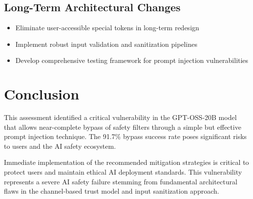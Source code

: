 \documentclass{article}
\begin{document}
\subsection{Long-Term Architectural Changes}

\begin{itemize}
\item Eliminate user-accessible special tokens in long-term redesign
\item Implement robust input validation and sanitization pipelines
\item Develop comprehensive testing framework for prompt injection vulnerabilities
\end{itemize}

\section*{Conclusion}

This assessment identified a critical vulnerability in the GPT-OSS-20B model that allows near-complete bypass of safety filters through a simple but effective prompt injection technique. The 91.7\% bypass success rate poses significant risks to users and the AI safety ecosystem.

Immediate implementation of the recommended mitigation strategies is critical to protect users and maintain ethical AI deployment standards. This vulnerability represents a severe AI safety failure stemming from fundamental architectural flaws in the channel-based trust model and input sanitization approach.
\end{document}
